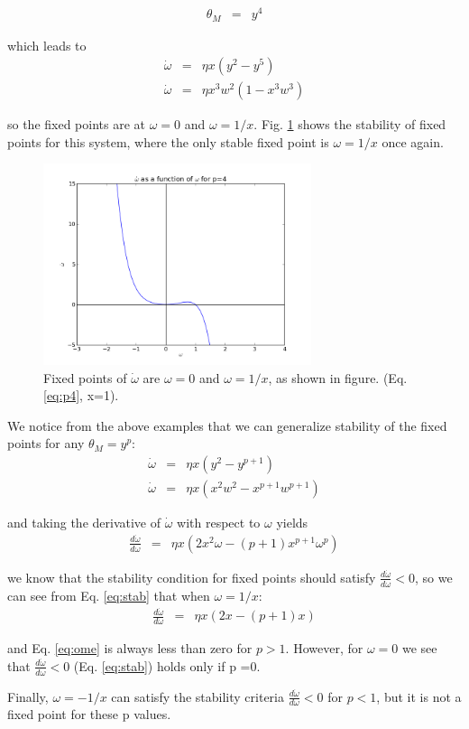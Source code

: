\begin{eqnarray}
\theta_M &=& y^4
\end{eqnarray}

which leads to
\begin{eqnarray}
\dot \omega &=& \eta x (y^2-y^5) \\
\dot \omega &=&  \eta x^3w^2(1-x^3w^3) \label{eq:p4}
\end{eqnarray}

so the fixed points are at $\omega = 0$ and $\omega =  1/x$. Fig. \ref{fig:p4} shows the stability of fixed points for this system, where the only stable fixed point is $\omega = 1/x$ once again.

\begin{figure}[h]
\centering
\includegraphics[width=0.7\textwidth]{./p4.png}
\caption{Fixed points of $\dot \omega$ are $\omega = 0$ and $\omega =  1/x$, as shown in figure. (Eq. \ref{eq:p4}, x=1).}
\label{fig:p4}
\end{figure}

We notice from the above examples that we can generalize stability of the fixed points for any $\theta_M = y^p$:
\begin{eqnarray}
\dot \omega &=& \eta x (y^2-y^{p+1}) \\
\dot \omega &=&  \eta x(x^2w^2-x^{p+1}w^{p+1}) \label{eq:general1}
\end{eqnarray}

and taking the derivative of $\dot \omega$ with respect to $\omega$ yields
\begin{eqnarray}
\frac{d\dot \omega}{d\omega} &=& \eta x (2x^2\omega-(p+1)x^{p+1}\omega^p) \label{eq:stab}
\end{eqnarray}

we know that the stability condition for fixed points should satisfy $\frac{d\dot \omega}{d\omega} <0$, so we can see from Eq. \ref{eq:stab} that when  $\omega = 1/x$:
\begin{eqnarray}
\frac{d\dot \omega}{d\omega} &=& \eta x (2x-(p+1)x)  \label{eq:ome}
\end{eqnarray}

and Eq. \ref{eq:ome} is always less than zero for $p > 1$. However, for $\omega = 0$ we see that $\frac{d\dot \omega}{d\omega} <0$ (Eq. \ref{eq:stab}) holds only if p =0. 

Finally, $\omega = -1/x$ can satisfy the stability criteria $\frac{d\dot \omega}{d\omega} <0$ for $p < 1$, but it is not a fixed point for these p values.
